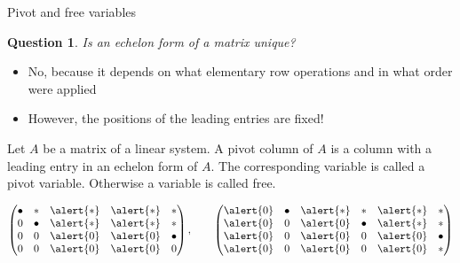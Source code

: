 \documentclass%
[handout]%
{beamer}
\newtheorem{question}{Question}
\begin{document}
\begin{frame}[label=pivot-free]{Pivot and free variables}

\vspace*{-8pt}

\begin{question}
  Is an echelon form of a matrix unique?
\end{question}

\vspace*{-8pt}

\begin{itemize}
\item
  \alert{No}, because it depends on what elementary row operations and in what order were applied
\item However, the positions of the leading entries are fixed!
\end{itemize}


\vspace*{-8pt}

\begin{definition}
Let $A$ be a matrix of a linear system.
A \alert{pivot column} of $A$ is a column with a leading entry in an echelon form of $A$.
The corresponding variable is called a \alert{pivot variable}.
Otherwise a variable is called \alert{free}.
\end{definition}

\vspace*{-8pt}

\begin{example}
  \[
    \begin{pmatrix}%
      \bullet & \ast    & \alert{\ast}  & \alert{\ast}  & \ast \\
      0       & \bullet & \alert{\ast}  & \alert{\ast}  & \ast \\
      0       &     0   &   \alert{0}   &   \alert{0}   & \bullet \\
      0       &     0   &   \alert{0}   &   \alert{0}   & 0
    \end{pmatrix},
    \qquad
    \begin{pmatrix}%
     \alert{0}       &   \bullet & \alert{\ast}  & \ast    & \alert{\ast}  & \ast\\
     \alert{0}       &   0     & \alert{0}     & \bullet   & \alert{\ast}  & \ast   \\
     \alert{0}       &     0   &   \alert{0}   &   0       & \alert{0}     & \bullet\\
     \alert{0}       &     0   &   \alert{0}   &   0       & \alert{0}     &  \ast
    \end{pmatrix}
\]
\end{example}

\end{frame}
\end{document}
